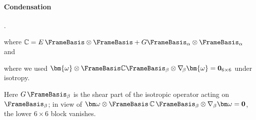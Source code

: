 \paragraph{Condensation}
.

\begin{Quote}

where \(\mathbb{C} = E\,\FrameBasis\otimes\FrameBasis + G\FrameBasis_{\alpha}\otimes\FrameBasis_{\alpha}\) and

where we used \(\bm{\omega}\otimes\FrameBasis\mathbb{C}\FrameBasis_{\beta}\otimes\nabla_{\!\beta}\bm{\omega} = \mathbf{0}_{6\times 6}\) under isotropy.

Here \(G\,\FrameBasis_\beta\) is the shear part of the isotropic operator acting on \(\FrameBasis_\beta\); in view of 
\(\bm\omega\otimes\FrameBasis\,\mathbb C\,\FrameBasis_\beta\otimes\nabla_\beta\bm\omega=\mathbf{0}\), the lower \(6\times 6\) block vanishes.



\end{Quote}
